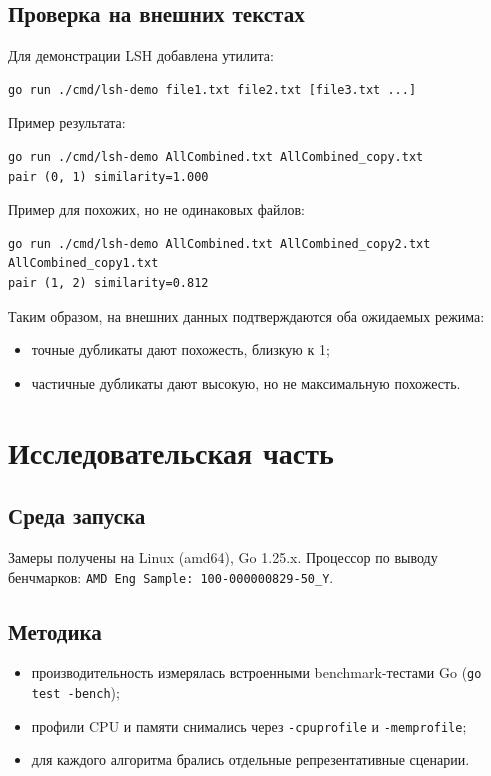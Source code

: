 \documentclass{itmo}
\begin{document}
\section{Проверка на внешних текстах}

Для демонстрации LSH добавлена утилита:
\begin{verbatim}
go run ./cmd/lsh-demo file1.txt file2.txt [file3.txt ...]
\end{verbatim}

Пример результата:
\begin{verbatim}
go run ./cmd/lsh-demo AllCombined.txt AllCombined_copy.txt
pair (0, 1) similarity=1.000
\end{verbatim}

Пример для похожих, но не одинаковых файлов:
\begin{verbatim}
go run ./cmd/lsh-demo AllCombined.txt AllCombined_copy2.txt AllCombined_copy1.txt
pair (1, 2) similarity=0.812
\end{verbatim}

Таким образом, на внешних данных подтверждаются оба ожидаемых режима:
\begin{itemize}
	\item точные дубликаты дают похожесть, близкую к 1;
	\item частичные дубликаты дают высокую, но не максимальную похожесть.
\end{itemize}

\chapter{Исследовательская часть}

\section{Среда запуска}

Замеры получены на Linux (amd64), Go 1.25.x.
Процессор по выводу бенчмарков:
\texttt{AMD Eng Sample: 100-000000829-50\_Y}.

\section{Методика}

\begin{itemize}
	\item производительность измерялась встроенными benchmark-тестами Go (\texttt{go test -bench});
	\item профили CPU и памяти снимались через \texttt{-cpuprofile} и \texttt{-memprofile};
	\item для каждого алгоритма брались отдельные репрезентативные сценарии.
\end{itemize}
\end{document}
